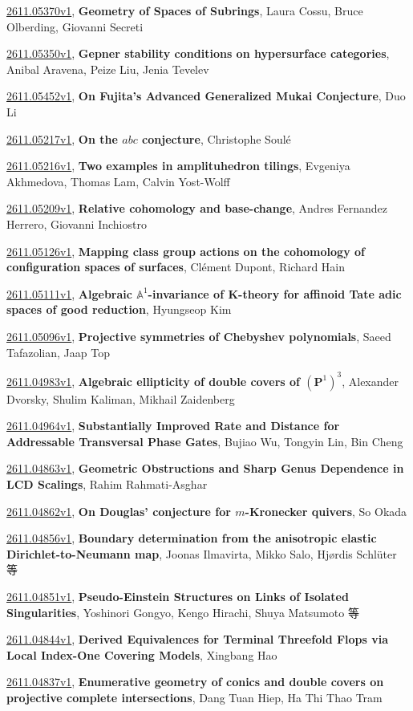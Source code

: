 \documentclass[9pt, a4paper]{article}
\theoremstyle{plain}
\theoremstyle{definition}
\theoremstyle{remark}
\newcommand{\arxiv}[3]{\href{https://arxiv.org/abs/#1}{#1}, \textbf{\textcolor{arxivblue}{#2}}, #3}
\begin{document}
\arxiv{2611.05370v1}{Geometry of Spaces of Subrings}{Laura Cossu, Bruce Olberding, Giovanni Secreti}

\arxiv{2611.05350v1}{Gepner stability conditions on hypersurface categories}{Anibal Aravena, Peize Liu, Jenia Tevelev}

\arxiv{2611.05452v1}{On Fujita's Advanced Generalized Mukai Conjecture}{Duo Li}

\arxiv{2611.05217v1}{On the $abc$ conjecture}{Christophe Soulé}

\arxiv{2611.05216v1}{Two examples in amplituhedron tilings}{Evgeniya Akhmedova, Thomas Lam, Calvin Yost-Wolff}

\arxiv{2611.05209v1}{Relative cohomology and base-change}{Andres Fernandez Herrero, Giovanni Inchiostro}

\arxiv{2611.05126v1}{Mapping class group actions on the cohomology of configuration spaces of surfaces}{Clément Dupont, Richard Hain}

\arxiv{2611.05111v1}{Algebraic $\mathbb{A}^{1}$-invariance of K-theory for affinoid Tate adic spaces of good reduction}{Hyungseop Kim}

\arxiv{2611.05096v1}{Projective symmetries of Chebyshev polynomials}{Saeed Tafazolian, Jaap Top}

\arxiv{2611.04983v1}{Algebraic ellipticity of double covers of $(\mathbf P^1)^3$}{Alexander Dvorsky, Shulim Kaliman, Mikhail Zaidenberg}

\arxiv{2611.04964v1}{Substantially Improved Rate and Distance for Addressable Transversal Phase Gates}{Bujiao Wu, Tongyin Lin, Bin Cheng}

\arxiv{2611.04863v1}{Geometric Obstructions and Sharp Genus Dependence in LCD Scalings}{Rahim Rahmati-Asghar}

\arxiv{2611.04862v1}{On Douglas' conjecture for $m$-Kronecker quivers}{So Okada}

\arxiv{2611.04856v1}{Boundary determination from the anisotropic elastic Dirichlet-to-Neumann map}{Joonas Ilmavirta, Mikko Salo, Hjørdis Schlüter 等}

\arxiv{2611.04851v1}{Pseudo-Einstein Structures on Links of Isolated Singularities}{Yoshinori Gongyo, Kengo Hirachi, Shuya Matsumoto 等}

\arxiv{2611.04844v1}{Derived Equivalences for Terminal Threefold Flops via Local Index-One Covering Models}{Xingbang Hao}

\arxiv{2611.04837v1}{Enumerative geometry of conics and double covers on projective complete intersections}{Dang Tuan Hiep, Ha Thi Thao Tram}
\end{document}
